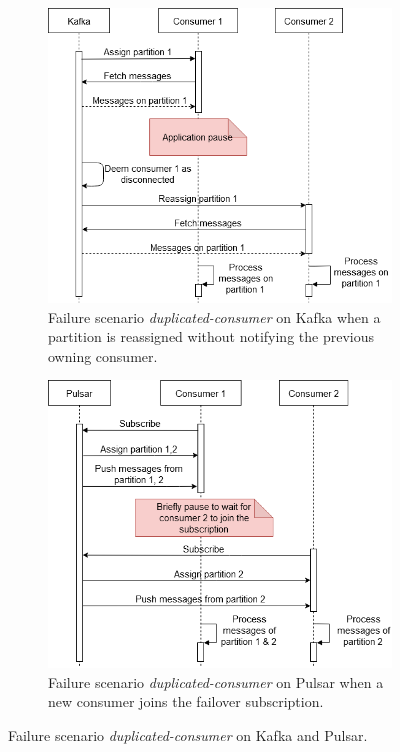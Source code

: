 \begin{figure}[t!]
	\begin{adjustwidth}{-2cm}{-2cm}
	\centering

	\begin{subfigure}[t]{0.49\linewidth}
		\centering
		\includegraphics[width=\linewidth]{images/kafka-duplicated-scenario.png}
		\caption{Failure scenario \emph{duplicated-consumer} on Kafka when a partition is reassigned without notifying the previous owning consumer.}
		\label{fig:kafkascenario}
	\end{subfigure}
	\begin{subfigure}[t]{0.49\linewidth}
		\centering
		\includegraphics[width=\linewidth]{images/pulsar-duplicated-scenario.png}
		\caption{Failure scenario \emph{duplicated-consumer} on Pulsar when a new consumer joins the failover subscription.}
		\label{fig:pulsarscenario}
	\end{subfigure}
\end{adjustwidth}
	\caption{Failure scenario \emph{duplicated-consumer} on Kafka and Pulsar.}
	\label{fig:failurescenario}
\end{figure}

